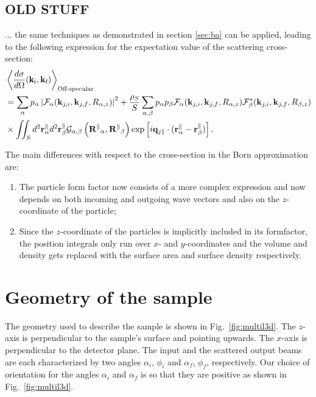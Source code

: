 \subsection{OLD STUFF}

... the same techniques as demonstrated in section \ref{sec:ba} can be applied, leading to the following expression for the expectation value of the scattering cross-section:
\begin{align*}
  & \left\langle \frac{d\sigma}{d\Omega}(\mathbf{k}_{\text{i}},\mathbf{k}_{\text{f}}) \right\rangle_{\text{Off-specular}}  \\
  & = \sum_\alpha p_\alpha \left\lvert \mathcal{F}_\alpha(\mathbf{k}_{j,i},\mathbf{k}_{j,f}, R_{\alpha,z})\right\rvert ^2 + \frac{\rho_S}{S}\sum_{\alpha,\beta} p_\alpha p_\beta \mathcal{F}_\alpha (\mathbf{k}_{j,i},\mathbf{k}_{j,f}, R_{\alpha,z})\mathcal{F}_\beta^*(\mathbf{k}_{j,i},\mathbf{k}_{j,f}, R_{\beta,z}) \\
  & \times \iint_S d^2\mathbf{r}_\alpha^\parallel d^2\mathbf{r}_\beta^\parallel \mathcal{G}_{\alpha ,\beta}\left( \mathbf{R^\parallel}_{\alpha} , \mathbf{R^\parallel}_{\beta} \right) \exp \left[ i\mathbf{q}_{j\parallel}\cdot (\mathbf{r}_\alpha^\parallel - \mathbf{r}_\beta^\parallel ) \right].
\end{align*}

The main differences with respect to the cross-section in the Born approximation are:
\begin{enumerate}
  \item The particle form factor now consists of a more complex expression and now depends on both incoming and outgoing wave vectors and also on the $z$-coordinate of the particle;
  \item Since the $z$-coordinate of the particles is implicitly included in its formfactor, the position integrals only run over $x$- and $y$-coordinates and the volume and density gets replaced with the surface area and surface density respectively.
\end{enumerate}

\section{Geometry of the sample}

\noindent The geometry used to describe the sample is
shown in Fig.~\ref{fig:multil3d}. The $z$-axis is perpendicular to the sample's
surface and pointing upwards. The $x$-axis  is perpendicular to the
detector plane. The input and the
scattered output beams are each characterized by two angles
$\alpha_i$, $\phi_i$ and $\alpha_f$, $\phi_f$, respectively. Our choice of orientation for the
angles $\alpha_i$ and $\alpha_f$ is so that they are positive
as shown in Fig.~\ref{fig:multil3d}. \\

